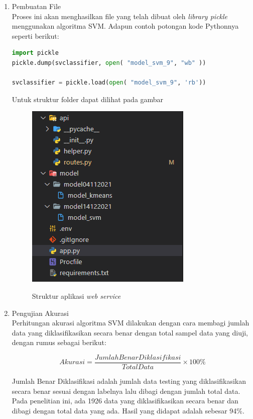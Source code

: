 \begin{enumerate} [1.]
	\item Pembuatan File
	      \\Proses ini akan menghasilkan file yang telah dibuat oleh \textit{library pickle} menggunakan algoritma SVM. Adapun contoh potongan kode Pythonnya seperti berikut:

	      \begin{lstlisting}[label=MinMAxdanPCA,language=Python]
import pickle
pickle.dump(svclassifier, open( "model_svm_9", "wb" ))

svclassifier = pickle.load(open( "model_svm_9", 'rb'))
		  \end{lstlisting}

	      \par Untuk struktur folder dapat dilihat pada gambar

	      \begin{figure}[H]
		      \center
		      \shadowbox
		      {\includegraphics [width=.4\textwidth]{gambar/strukturcodemodel.png}}
		      \caption{Struktur aplikasi \textit{web service}}
		      \label{usecasemapping}
	      \end{figure}

	\item Pengujian Akurasi
	      \\Perhitungan akurasi algoritma SVM dilakukan dengan cara membagi jumlah data yang diklasifikasikan secara benar dengan total sampel data yang diuji, dengan rumus sebagai berikut:

	      \begin{equation}
		      Akurasi = \frac{Jumlah Benar Diklasifikasi}{Total Data}\times100\%
	      \end{equation}

	      \par Jumlah Benar Diklasifikasi adalah jumlah data testing yang diklasifikasikan secara benar sesuai dengan labelnya lalu dibagi dengan jumlah total data. Pada penelitian ini, ada 1926 data yang diklasifikasikan secara benar dan dibagi dengan total data yang ada. Hasil yang didapat adalah sebesar 94\%.


\end{enumerate}

